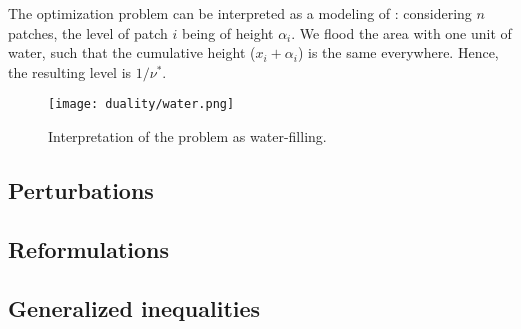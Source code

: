 The optimization problem can be interpreted as a modeling of : considering $n$ patches, the level of patch $i$ being of height $\alpha_i$. We flood the area with one unit of water, such that the cumulative height ($x_i+\alpha_i$) is the same everywhere. Hence, the resulting level is $1/\nu^*$.
\begin{figure}[H]
    \centering
    \texttt{[image: duality/water.png]}
    \caption{Interpretation of the problem as water-filling.}
\end{figure}

\subsection{Perturbations}

\subsection{Reformulations}

\subsection{Generalized inequalities}